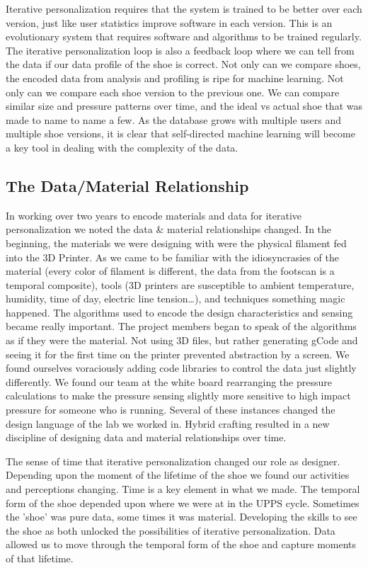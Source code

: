 Iterative personalization requires that the system is trained to be better over each version, just like user statistics improve software in each version. This is an evolutionary system that requires software and algorithms to be trained regularly. The iterative personalization loop is also a feedback loop where we can tell from the data if our data profile of the shoe is correct. Not only can we compare shoes, the encoded data from analysis and profiling is ripe for machine learning. Not only can we compare each shoe version to the previous one. We can compare similar size and pressure patterns over time, and the ideal vs actual shoe that was made to name to name a few. As the database grows with multiple users and multiple shoe versions, it is clear that self-directed machine learning will become a key tool in dealing with the complexity of the data.  

\subsection{The Data/Material Relationship}
In working over two years to encode materials and data for iterative personalization we noted the data \& material relationships changed. In the beginning, the materials we were designing with were the physical filament fed into the 3D Printer. As we came to be familiar with the idiosyncrasies of the material (every color of filament is different, the data from the footscan is a temporal composite), tools (3D printers are susceptible to ambient temperature, humidity, time of day, electric line tension…), and techniques something magic happened. The algorithms used to encode the design characteristics and sensing became really important. The project members began to speak of the algorithms as if they were the material. Not using 3D files, but rather generating gCode and seeing it for the first time on the printer prevented abstraction by a screen. We found ourselves voraciously adding code libraries to control the data just slightly differently. We found our team at the white board rearranging the pressure calculations to make the pressure sensing slightly more sensitive to high impact pressure for someone who is running. Several of these instances changed the design language of the lab we worked in. Hybrid crafting resulted in a new discipline of designing data and material relationships over time. 

The sense of time that iterative personalization changed our role as designer. Depending upon the moment of the lifetime of the shoe we found our activities and perceptions changing. Time is a key element in what we made. The temporal form of the shoe depended upon where we were at in the UPPS cycle. Sometimes the 'shoe' was pure data, some times it was material. Developing the skills to see the shoe as both unlocked the possibilities of iterative personalization. Data allowed us to move through the temporal form of the shoe and capture moments of that lifetime. 

